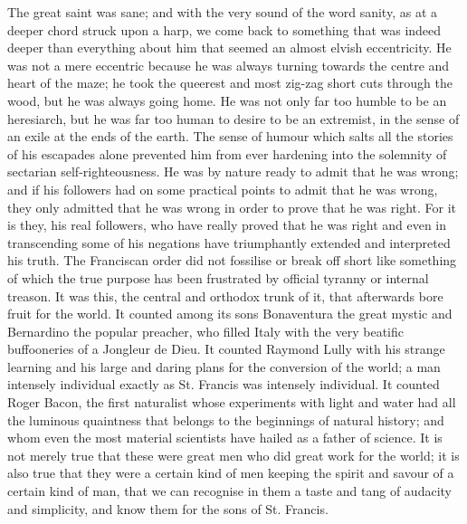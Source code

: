 \documentclass{book}
\begin{document}
The great saint was sane; and with the very sound of the word sanity, as at a deeper chord struck upon a harp, we come back to something that was indeed deeper than everything about him that seemed an almost elvish eccentricity. He was not a mere eccentric because he was always turning towards the centre and heart of the maze; he took the queerest and most zig-zag short cuts through the wood, but he was always going home. He was not only far too humble to be an heresiarch, but he was far too human to desire to be an extremist, in the sense of an exile at the ends of the earth. The sense of humour which salts all the stories of his escapades alone prevented him from ever hardening into the solemnity of sectarian self-righteousness. He was by nature ready to admit that he was wrong; and if his followers had on some practical points to admit that he was wrong, they only admitted that he was wrong in order to prove that he was right. For it is they, his real followers, who have really proved that he was right and even in transcending some of his negations have triumphantly extended and interpreted his truth. The Franciscan order did not fossilise or break off short like something of which the true purpose has been frustrated by official tyranny or internal treason. It was this, the central and orthodox trunk of it, that afterwards bore fruit for the world. It counted among its sons Bonaventura the great mystic and Bernardino the popular preacher, who filled Italy with the very beatific buffooneries of a Jongleur de Dieu. It counted Raymond Lully with his strange learning and his large and daring plans for the conversion of the world; a man intensely individual exactly as St. Francis was intensely individual. It counted Roger Bacon, the first naturalist whose experiments with light and water had all the luminous quaintness that belongs to the beginnings of natural history; and whom even the most material scientists have hailed as a father of science. It is not merely true that these were great men who did great work for the world; it is also true that they were a certain kind of men keeping the spirit and savour of a certain kind of man, that we can recognise in them a taste and tang of audacity and simplicity, and know them for the sons of St. Francis.
\end{document}
